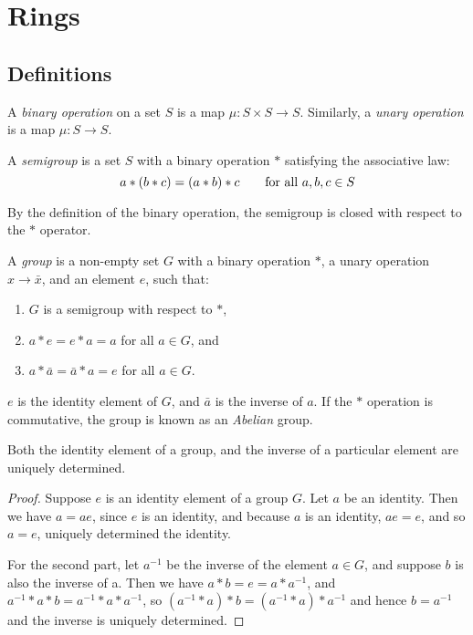 \section{Rings}

\subsection{Definitions}

  \begin{Def}
    A \emph{binary operation} on a set $S$ is a map $\mu:S \times S \to S$.
    Similarly, a \emph{unary operation} is a map $\mu:S \to S$.
  \end{Def}

  \begin{Def}
    A \emph{semigroup} is a set $S$ with a binary operation $*$ satisfying
    the associative law:
    \[
      a * (b * c) = (a * b) * c \text{\qquad for all } a, b,c \in S
    \]

    By the definition of the binary operation, the semigroup is closed with
    respect to the $*$ operator.

  \end{Def}

  \begin{Def} A \emph{group} is a non-empty set $G$ with a binary
    operation $*$, a unary operation $x \to \bar{x}$,
    and an element $e$, such that:
    \begin{enumerate}
      \item $G$ is a semigroup with respect to $*$,
      \item $a * e = e * a = a$ for all $a \in G$, and
      \item $a * \bar{a} = \bar{a} * a = e$ for all $a \in G$.
    \end{enumerate}
    $e$ is the identity element of $G$, and $\bar{a}$ is the inverse of $a$.
    If the $*$ operation is commutative, the group is known as an
    \emph{Abelian} group.

  \end{Def}

  \begin{Lemma}
    Both the identity element of a group, and the inverse of a particular
    element are uniquely determined.
  \end{Lemma}

  \begin{proof}
    Suppose $e$ is an identity element of a group $G$. Let $a$ be an identity.
    Then we have $a = ae$, since $e$ is an identity, and because $a$ is an
    identity, $ae = e$, and so $a = e$, uniquely determined the identity.

    For the second part, let $a^{-1}$ be the inverse of the element $a \in G$,
    and suppose $b$ is also the inverse of a. Then we have $a * b = e = a *
    a^{-1}$, and $ a^{-1} * a * b = a^{-1} * a * a^{-1} $, so $ (a^{-1} * a) *
    b = (a^{-1} * a) * a^{-1} $ and hence $b = a^{-1}$ and the inverse is
    uniquely determined.
  \end{proof}

